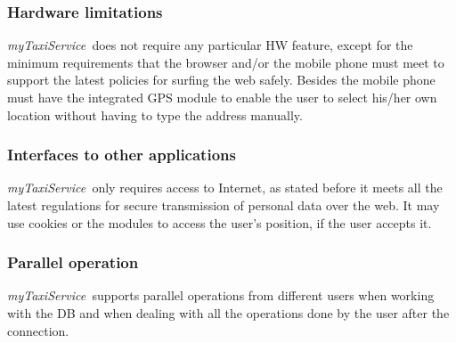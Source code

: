 \documentclass[a4paper,11pt]{report} %
\newcommand{\mts}{\mbox{\normalfont\itshape myTaxiService\ }}
\begin{document}
	\subsubsection{Hardware limitations} \mts does not require any particular HW feature, except for the minimum requirements that the browser and/or the mobile phone must meet to support the latest policies for surfing the web safely. Besides the mobile phone must have the integrated GPS module to enable the user to select his/her own location without having to type the address manually.
	
	\subsubsection{Interfaces to other applications} \mts only requires access to Internet, as stated before it meets all the latest regulations for secure transmission of personal data over the web. It may use cookies or the modules to access the user's position, if the user accepts it.
	
	\subsubsection{Parallel operation} \mts supports parallel operations from different users when working	with the DB and when dealing with all the operations done by the user after the connection.
	
\end{document}
